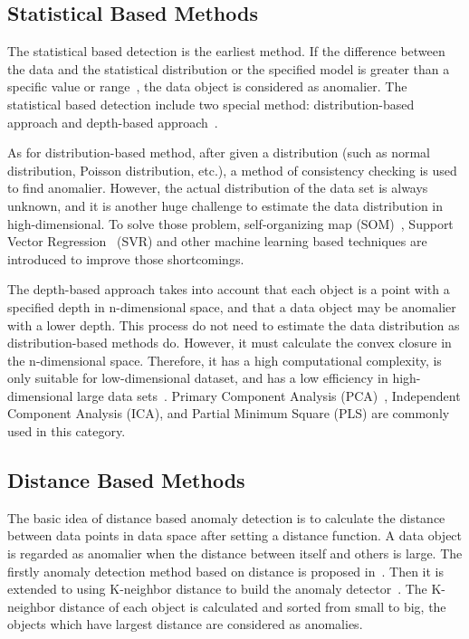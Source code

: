 \subsection{Statistical Based Methods}

The statistical based detection is the earliest method. 
If the difference between the data and the statistical 
distribution or the specified model 
is greater than a specific value or range~\cite{chandola2009anomaly}, 
the data object is considered as anomalier. 
The statistical based detection include two special method: 
distribution-based approach and 
depth-based approach~\cite{wu2016survey}.

As for distribution-based method,
after given a distribution (such as
normal distribution,
Poisson distribution,
etc.),
a method of consistency checking is used to find anomalier.
However,
the actual distribution of the data set is always unknown,
and it is another huge challenge to
estimate the data distribution in high-dimensional.
To solve those problem,
self-organizing map (SOM)~\cite{siripanadorn2010anomaly},
Support Vector Regression~\cite{kromanis2013support} (SVR) and
other machine learning based techniques are introduced to
improve those shortcomings.


The depth-based approach takes into account 
that each object is a point with 
a specified depth in n-dimensional space, 
and that a data object  may be anomalier with a lower depth. 
This process do not need to estimate the data distribution as
distribution-based methods do. 
However, 
it must calculate the convex closure in the n-dimensional space. 
Therefore, 
it has a high computational complexity, 
is only suitable for low-dimensional dataset, 
and has a low efficiency in high-dimensional large data sets~\cite{ruts1996computing}. 
Primary Component Analysis (PCA)~\cite{deng2013modified}, 
Independent Component Analysis (ICA), 
and Partial Minimum Square (PLS)\cite{yin2014improved} 
are commonly used in this category.

\subsection{Distance Based Methods}

The basic idea of distance based anomaly detection
is to calculate the distance between data points in
data space after setting a distance function.
A data object is regarded as anomalier when
the distance between  itself and others is large.
The firstly anomaly detection method
based on distance is proposed in~\cite{knorr1997unified}.
Then it is extended to using K-neighbor distance to
build the anomaly detector~\cite{ramaswamy2000efficient,kuang2008anomaly}.
The K-neighbor distance of each object is calculated and
sorted from small to big,
the objects which have largest
distance are considered as anomalies.

